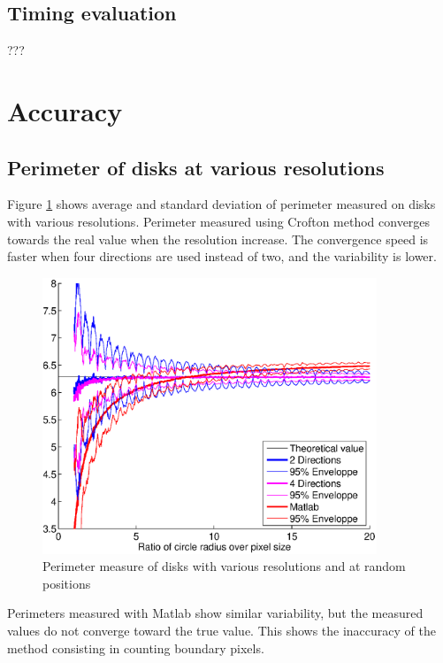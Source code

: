\documentclass{InsightArticle}
\begin{document}
\subsection{Timing evaluation}

???

\section{Accuracy}

\subsection{Perimeter of disks at various resolutions}

Figure \ref{fig:MeasureDiskPerimeter} shows average and standard deviation of perimeter
measured on disks with various resolutions. Perimeter measured using Crofton method converges
towards the real value when the resolution increase. 
The convergence speed is faster when four directions are used instead of two, 
and the variability is lower.

\begin{figure}[!htb]
\begin{center}
\includegraphics[width=10cm]{images/perimeterDisks}
\end{center}
\caption{Perimeter measure of disks with various resolutions and at random positions}
\label{fig:MeasureDiskPerimeter}
\end{figure}

Perimeters measured with Matlab show similar variability, but the measured values do not
converge toward the true value. This shows the inaccuracy of the method consisting in
counting boundary pixels.
\end{document}

